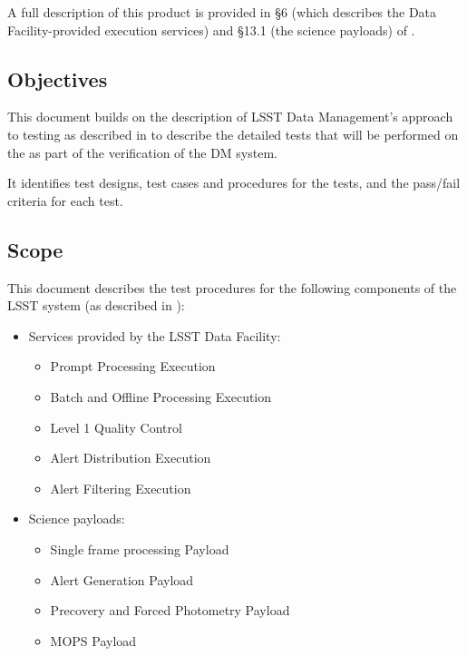 \documentclass[DM,STS,toc]{lsstdoc}
\begin{document}
A full description of this product is provided in \S6 (which describes the
Data Facility-provided execution services) and \S13.1 (the science payloads) of
.

\subsection{Objectives}
\label{sec:objectives}

This document builds on the description of LSST Data Management's approach to
testing as described in  to describe the detailed tests that
will be performed on the \product{} as part of the verification of the DM system.

It identifies test designs, test cases and procedures for the tests, and the
pass/fail criteria for each test.

\subsection{Scope}
\label{sec:scope}

This document describes the test procedures for the following components of
the LSST system (as described in ):

\begin{itemize}

  \item{Services provided by the LSST Data Facility:

    \begin{itemize}
      \item{Prompt Processing Execution}
      \item{Batch and Offline Processing Execution}
      \item{Level 1 Quality Control}
      \item{Alert Distribution Execution}
      \item{Alert Filtering Execution}
    \end{itemize}
  }

  \item{Science payloads:

    \begin{itemize}
      \item{Single frame processing Payload}
      \item{Alert Generation Payload}
      \item{Precovery and Forced Photometry Payload}
      \item{MOPS Payload}
    \end{itemize}

  }

\end{itemize}
\end{document}
